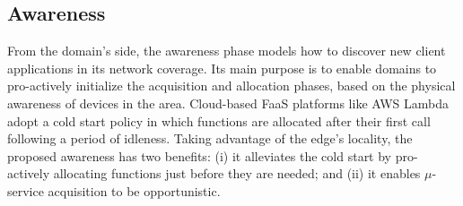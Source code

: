 

\subsection{Awareness}\label{sec:A3-E-awareness}


From the domain's side, the awareness phase models how to discover new client applications in its network coverage. Its main purpose is to enable domains to pro-actively initialize the acquisition and allocation phases, based on the physical awareness of devices in the area. Cloud-based FaaS platforms like AWS Lambda adopt a cold start policy in which functions are allocated after their first call following a period of idleness. Taking advantage of the edge's locality, the proposed awareness has two benefits: (i) it alleviates the cold start by pro-actively allocating functions just before they are needed; and (ii) it enables $\mu$-service acquisition to be opportunistic.



